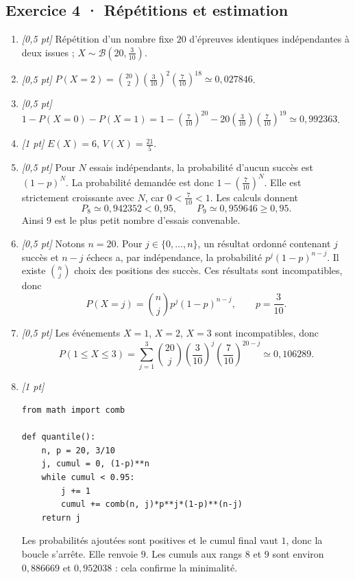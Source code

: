\subsection*{Exercice 4 · Répétitions et estimation}\begin{enumerate}

\item \textit{[0,5 pt]} Répétition d'un nombre fixe $20$ d'épreuves identiques indépendantes à deux issues ; $X\sim\mathcal B(20,\frac{3}{10})$.

\item \textit{[0,5 pt]} $P(X=2)=\binom{20}2(\frac{3}{10})^2(\frac{7}{10})^{18}\simeq0{,}027846$.

\item \textit{[0,5 pt]} $1-P(X=0)-P(X=1)=1-(\frac{7}{10})^{20}-20(\frac{3}{10})(\frac{7}{10})^{19}\simeq0{,}992363$.

\item \textit{[1 pt]} $E(X)=6$, $V(X)=\frac{21}{5}$.

\item \textit{[0,5 pt]} Pour $N$ essais indépendants, la probabilité d'aucun succès est $(1-p)^N$. La probabilité demandée est donc $1-(\frac{7}{10})^N$. Elle est strictement croissante avec $N$, car $0<\frac{7}{10}<1$. Les calculs donnent
\[P_{8}\simeq0{,}942352<0{,}95,\qquad P_{9}\simeq0{,}959646\ge0{,}95.\]
Ainsi $9$ est le plus petit nombre d'essais convenable.

\item \textit{[0,5 pt]} Notons $n=20$. Pour $j\in\{0,\ldots,n\}$, un résultat ordonné contenant $j$ succès et $n-j$ échecs a, par indépendance, la probabilité $p^j(1-p)^{n-j}$. Il existe $\binom nj$ choix des positions des succès. Ces résultats sont incompatibles, donc
\[P(X=j)=\binom nj p^j(1-p)^{n-j},\qquad p=\frac{3}{10}.\]

\item \textit{[0,5 pt]} Les événements $X=1$, $X=2$, $X=3$ sont incompatibles, donc
\[P(1\le X\le3)=\sum_{j=1}^3\binom{20}j(\frac{3}{10})^j(\frac{7}{10})^{20-j}\simeq0{,}106289.\]


\item \textit{[1 pt]} 
\begin{lstlisting}
from math import comb

def quantile():
    n, p = 20, 3/10
    j, cumul = 0, (1-p)**n
    while cumul < 0.95:
        j += 1
        cumul += comb(n, j)*p**j*(1-p)**(n-j)
    return j
\end{lstlisting}
Les probabilités ajoutées sont positives et le cumul final vaut $1$, donc la boucle s'arrête. Elle renvoie $9$. Les cumuls aux rangs $8$ et $9$ sont environ $0{,}886669$ et $0{,}952038$ : cela confirme la minimalité.

\end{enumerate}

